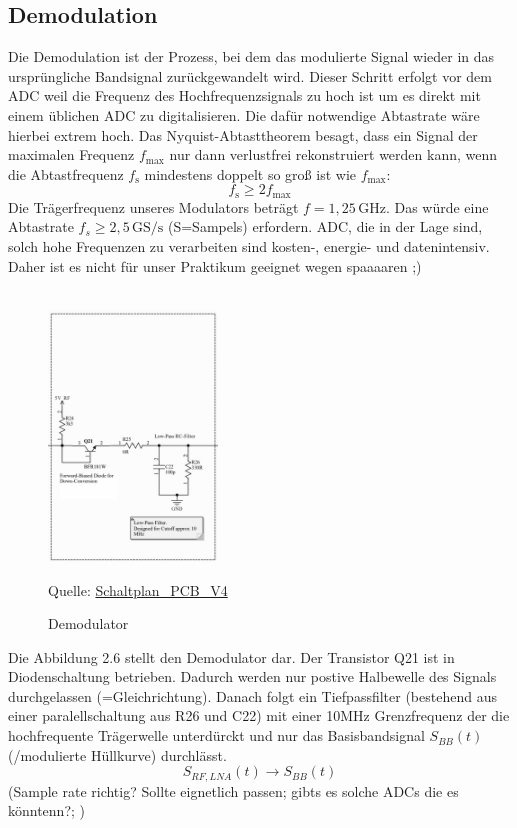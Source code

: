 \subsection{Demodulation}
Die Demodulation ist der Prozess, bei dem das modulierte Signal wieder in das ursprüngliche Bandsignal zurückgewandelt wird. Dieser Schritt erfolgt
vor dem ADC weil die Frequenz des Hochfrequenzsignals zu hoch ist um es direkt mit einem üblichen ADC zu digitalisieren. Die dafür notwendige
Abtastrate wäre hierbei extrem hoch.
Das Nyquist-Abtasttheorem besagt, dass ein Signal der maximalen Frequenz $f_\mathrm{max}$ nur dann verlustfrei rekonstruiert werden kann,
wenn die Abtastfrequenz $f_\mathrm{s}$ mindestens doppelt so groß ist wie $f_\mathrm{max}$:
\begin{equation}
    f_\mathrm{s} \geq 2 f_\mathrm{max}
\end{equation}
Die Trägerfrequenz unseres Modulators beträgt $f=1{,}25\,\mathrm{GHz}$. Das würde eine Abtastrate $f_{s} \geq 2{,}5\,\mathrm{GS/s}$ (S=Sampels) erfordern. ADC, die in der Lage sind, solch hohe Frequenzen
zu verarbeiten sind kosten-, energie- und datenintensiv. Daher ist es nicht für unser Praktikum geeignet wegen spaaaaren ;)\\
\\ 
\begin{figure}[H]
    \centering
    \includegraphics[width=0.4\textwidth]{Pictures/Demodulator.jpg}
    \caption{Demodulator}
    \footnotesize{Quelle: \url{Schaltplan_PCB_V4}}
\end{figure}



Die Abbildung 2.6 stellt den Demodulator dar. Der Transistor Q21 ist in Diodenschaltung betrieben. Dadurch werden nur postive Halbewelle des Signals 
durchgelassen (=Gleichrichtung). Danach folgt ein Tiefpassfilter (bestehend aus einer paralellschaltung aus R26 und C22) mit einer 10MHz Grenzfrequenz
der die hochfrequente Trägerwelle unterdürckt und nur das Basisbandsignal $S_{BB}(t)$ (/modulierte Hüllkurve) durchlässt.
\[
S_{RF,LNA}(t) \rightarrow S_{BB}(t)
\]
(Sample rate richtig? Sollte eignetlich passen; gibts es solche ADCs die es könntenn?;  )



